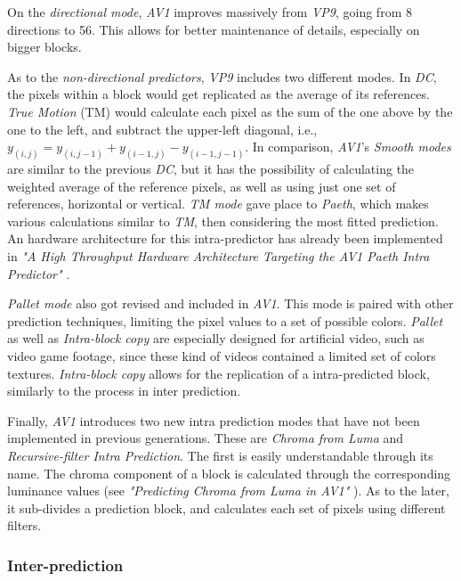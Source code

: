 On the \emph{directional mode}, \emph{AV1} improves massively from \emph{VP9}, going from 8 directions to 56. This allows for better maintenance of details, especially on bigger blocks. 

As to the \emph{non-directional predictors}, \emph{VP9} includes two different modes. In \emph{DC}, the pixels  within a block would get replicated as the average of its references. \emph{True Motion} (TM) would calculate each pixel as the sum of the one above by the one to the left, and subtract the upper-left diagonal, i.e., $y_{(i,j)}=y_{(i,j-1)}+y_{(i-1,j)}-y_{(i-1,j-1)}$. In comparison, \emph{AV1}'s \emph{Smooth modes} are similar to the previous \emph{DC}, but it has the possibility of calculating the weighted average of the reference pixels, as well as using just one set of references, horizontal or vertical. \emph{TM mode} gave place to \emph{Paeth}, which makes various calculations similar to \emph{TM}, then considering the most fitted prediction. An hardware architecture for this intra-predictor has already been implemented in \emph{"A High Throughput Hardware Architecture Targeting the AV1 Paeth Intra Predictor"} \cite{correaHighThroughputHardware2019}.

\emph{Pallet mode} also got revised and included in \emph{AV1}. This mode is paired with other prediction techniques, limiting the pixel values to a set of possible colors. \emph{Pallet} as well as \emph{Intra-block copy} are especially designed for artificial video, such as video game footage, since these kind of videos contained a limited set of colors textures. \emph{Intra-block copy} allows for the replication of a intra-predicted block, similarly to the process in inter prediction.

Finally, \emph{AV1} introduces two new intra prediction modes that have not been implemented in previous generations. These are \emph{Chroma from Luma} and \emph{Recursive-filter Intra Prediction}. The first is easily understandable through its name. The chroma component of a block is calculated through the corresponding luminance values (see \emph{"Predicting Chroma from Luma in AV1"} \cite{trudeauPredictingChromaLuma2018}). As to the later, it sub-divides a prediction block, and calculates each set of pixels using different filters.

\subsubsection{Inter-prediction}

